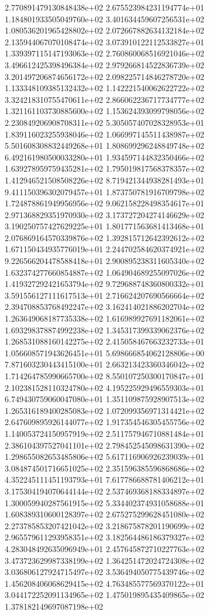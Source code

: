 2.770891479130848438e+02 2.675523984231194774e+01 1.184801933505049760e+02
3.401634459607256531e+02 1.080536201965428802e+02 2.072667882634132184e+02
2.135944067070108474e+02 3.073910122112533827e+01 1.339397115147193063e+02
2.760860068516921046e+02 3.496612425398496384e+02 2.979266814522836739e+02
3.201497206874656172e+02 2.098225714846278720e+02 1.133348109385132432e+02
1.142221540062622722e+02 3.324218310755470611e+02 2.866062236717734777e+02
1.321161103730885600e+02 1.153624393099798056e+02 2.230849206908708311e+02
5.305057407028328953e+01 1.839116023255938046e+02 1.066997145511438987e+02
5.501608308832449268e+01 1.808699296248849748e+02 6.492161980500033280e+01
1.934597144832350466e+02 1.639278959759435281e+02 1.795019817568378357e+02
1.412946521508508226e+02 8.719421344938281493e+01 9.411150396302079457e+01
1.873750781916709798e+02 1.724878861949956956e+02 9.062158228498354617e+01
2.971368829351970930e+02 3.173727204274146629e+02 3.190250757427629225e+01
1.801771563681413468e+01 2.076869164570339876e+02 1.392815712642392612e+02
1.671150434935776019e+01 2.244702584620374921e+02 9.226566204478588418e+01
2.900895238311605340e+02 1.632374277660854887e+02 1.064904689255097026e+02
1.419327292421653794e+02 9.729688748360800332e+01 3.591556127111617513e+01
2.716624207690566664e+02 2.394708853768492247e+02 3.162414021886202704e+02
1.263649068187735338e+02 1.616989927691182061e+02 1.693298378874992238e+02
1.345317399339062376e+02 1.268531088160142275e+02 2.415058467663232733e+01
1.056608571943626451e+01 5.698666854062128806e+00 7.871603230443415100e+01
2.663213423360346042e+02 1.714264785990665700e+02 8.550107250300170847e+01
2.102381528110324780e+02 4.195225929496559303e+01 6.749430759060047080e+01
1.351109875928907513e+02 1.265316189400285083e+02 1.072099356971314421e+02
2.647609895926144077e+02 1.917354546305455756e+02 1.140053724150957919e+02
2.511757946710881484e+01 2.386104397527041101e+02 2.798452545098631390e+02
1.298655082653485806e+02 5.617116906926239039e+01 3.084874501716651025e+02
2.351596385596868686e+02 4.352245111451193793e+01 7.617786688781406212e+01
3.175304194070644144e+02 2.537469368188334897e+02 1.300059940287561915e+02
5.334402374931058688e+01 1.608389310600128397e+02 2.675275299628451080e+02
2.273785853207421042e+02 3.218675878201190699e+02 2.965579611293958351e+02
3.182564486186379327e+02 4.283048492635096949e+01 2.457645872710227763e+02
3.473723629987338199e+02 1.364251472024724308e+02 3.036806127924715497e+02
3.536494050775439746e+02 1.456208406068629415e+02 4.763485577569370122e+01
3.044172252091134965e+02 1.475019895435409865e+02 1.378182149697087198e+02
